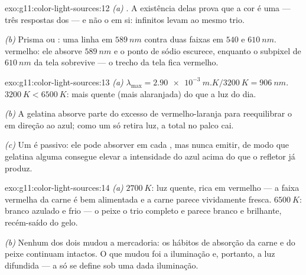 \begin{solution}{exo:g11:color-light-sources:12}
\emph{(a)} . A existência delas prova que a cor é uma 
--- três respostas dos  --- e não o  em si: infinitos
 levam ao mesmo trio.

\emph{(b)} Prisma ou : uma linha em $\qty{589}{nm}$ contra
duas faixas em $540$ e $\qty{610}{nm}$.  vermelho: ele absorve
$\qty{589}{nm}$ e o ponto de sódio escurece, enquanto o subpixel de
$\qty{610}{nm}$ da tela sobrevive --- o trecho da tela fica vermelho.
\end{solution}

\begin{solution}{exo:g11:color-light-sources:13}
\emph{(a)} $\lambda_{\max} = \qty{2.90e-3}{m.K}/\qty{3200}{K} =
\qty{906}{nm}$.  $\qty{3200}{K} < \qty{6500}{K}$: mais
quente (mais alaranjada) do que a luz do dia.

\emph{(b)} A gelatina absorve parte do excesso de vermelho-laranja para
reequilibrar o  em direção ao azul; como um  só retira luz,
a  total no palco cai.

\emph{(c)} Um  é passivo: ele pode absorver em cada , mas nunca emitir, de modo que gelatina alguma consegue elevar a
intensidade do azul acima do que o refletor já produz.
\end{solution}

\begin{solution}{exo:g11:color-light-sources:14}
\emph{(a)} $\qty{2700}{K}$: luz quente, rica em vermelho --- a faixa
vermelha da carne é bem alimentada e a carne parece vividamente fresca.
$\qty{6500}{K}$: branco azulado e frio --- o peixe  o trio
completo e parece branco e brilhante, recém-saído do gelo.

\emph{(b)} Nenhum dos dois mudou a mercadoria: os hábitos de absorção da
carne e do peixe continuam intactos. O que mudou foi a iluminação e,
portanto, a luz difundida --- a  só se define sob uma
dada iluminação.
\end{solution}

